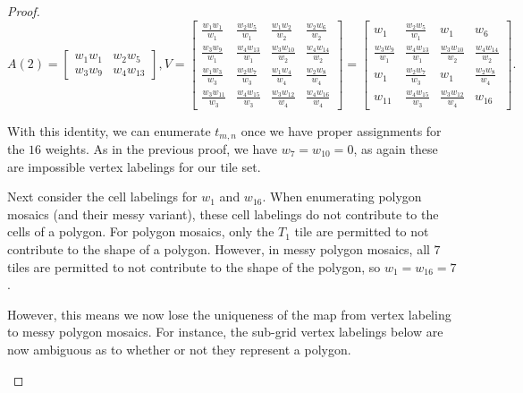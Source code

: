 \documentclass[12pt]{article}
\theoremstyle{plain}
\theoremstyle{definition}
\theoremstyle{remark}
\theoremstyle{definition}
\newcommand{\cell}[4]{ \draw[thick] ( #1 , #2 ) rectangle ( #3 , #4 );}
\begin{document}
\begin{proof}
$$
A(2) = 
\begin{bmatrix}
    w_{1}w_{1} & w_{2} w_{5} \\
    w_{3} w_{9} & w_{4} w_{13}
\end{bmatrix},
V = 
\begin{bmatrix}
    \frac{w_{1} w_{1}}{w_{1}} & \frac{w_{2} w_{5}}{w_{1}} & \frac{w_{1} w_{2}}{w_{2}} & \frac{w_{2} w_{6}}{w_{2}} \\
    \frac{w_{3} w_{9}}{w_{1}} & \frac{w_{4} w_{13}}{w_{1}} & \frac{w_{3} w_{10}}{w_{2}} & \frac{w_{4} w_{14}}{w_{2}} \\
    \frac{w_{1} w_{3}}{w_{3}} & \frac{w_{2} w_{7}}{w_{3}} & \frac{w_{1} w_{4}}{w_{4}} & \frac{w_{2} w_{8}}{w_{4}} \\
    \frac{w_{3} w_{11}}{w_{3}} & \frac{w_{4} w_{15}}{w_{3}} & \frac{w_{3} w_{12}}{w_{4}} & \frac{w_{4} w_{16}}{w_{4}}
\end{bmatrix}
= 
\begin{bmatrix}
    w_{1} & \frac{w_{2} w_{5}}{w_{1}} & w_{1} & w_{6} \\
    \frac{w_{3} w_{9}}{w_{1}} & \frac{w_{4} w_{13}}{w_{1}} & \frac{w_{3} w_{10}}{w_{2}} & \frac{w_{4} w_{14}}{w_{2}} \\
    w_{1} & \frac{w_{2} w_{7}}{w_{3}} & w_{1} & \frac{w_{2} w_{8}}{w_{4}} \\
    w_{11} & \frac{w_{4} w_{15}}{w_{3}} & \frac{w_{3} w_{12}}{w_{4}} & w_{16}
\end{bmatrix}.
$$

With this identity, we can enumerate $t_{m,n}$ once we have proper assignments for the $16$ weights. As in the previous proof, we have $w_{7}=w_{10}=0$, as again these are impossible vertex labelings for our tile set. 

Next consider the cell labelings for $w_{1}$ and $w_{16}$. When enumerating polygon mosaics (and their messy variant), these cell labelings do not contribute to the cells of a polygon. For polygon mosaics, only the $T_1$ tile are permitted to not contribute to the shape of a polygon. However, in messy polygon mosaics, all $7$ tiles are permitted to not contribute to the shape of the polygon, so $w_{1} = w_{16}=7$.

However, this means we now lose the uniqueness of the map from vertex labeling to messy polygon mosaics. For instance, the sub-grid vertex labelings below are now ambiguous as to whether or not they represent a polygon.

\begin{center}
\end{center}
\end{proof}
\end{document}
